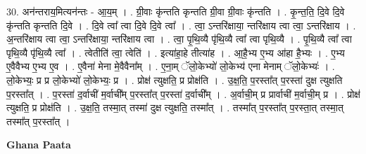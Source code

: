\documentclass[17pt]{extarticle}
\begin{document}
30. अन॑न्तराय॒मित्यन॑न्तः - आ॒य॒म् । . ग्री॒वाः कृ॑न्तति कृन्तति ग्री॒वा ग्री॒वाः कृ॑न्तति । . कृ॒न्त॒ति॒ दि॒वे दि॒वे कृ॑न्तति कृन्तति दि॒वे । . दि॒वे त्वा᳚ त्वा दि॒वे दि॒वे त्वा᳚ । . त्वा॒ ऽन्तरि॑क्षाया॒ न्तरि॑क्षाय त्वा त्वा॒ ऽन्तरि॑क्षाय । . अ॒न्तरि॑क्षाय त्वा त्वा॒ ऽन्तरि॑क्षाया॒ न्तरि॑क्षाय त्वा । . त्वा॒ पृ॒थि॒व्यै पृ॑थि॒व्यै त्वा᳚ त्वा पृथि॒व्यै । . पृ॒थि॒व्यै त्वा᳚ त्वा पृथि॒व्यै पृ॑थि॒व्यै त्वा᳚ । . त्वेतीति॑ त्वा॒ त्वेति॑ । . इत्या॑हा॒हे तीत्या॑ह । . आ॒है॒भ्य ए॒भ्य आ॑हा है॒भ्यः । . ए॒भ्य ए॒वैवैभ्य ए॒भ्य ए॒व । . ए॒वैना॑ मेना मे॒वैवैना᳚म् । . ए॒ना॒म् ॅलो॒केभ्यो॑ लो॒केभ्य॑ एना मेनाम् ॅलो॒केभ्यः॑ । . लो॒केभ्यः॒ प्र प्र लो॒केभ्यो॑ लो॒केभ्यः॒ प्र । . प्रोक्ष॑ त्युक्षति॒ प्र प्रोक्ष॑ति । . उ॒क्ष॒ति॒ प॒रस्ता᳚त् प॒रस्ता॑ दुक्ष त्युक्षति प॒रस्ता᳚त् । . प॒रस्ता॑ द॒र्वाची॑ म॒र्वाची᳚म् प॒रस्ता᳚त् प॒रस्ता॑ द॒र्वाची᳚म् । . अ॒र्वाची॒म् प्र प्रार्वाची॑ म॒र्वाची॒म् प्र । . प्रोक्ष॑ त्युक्षति॒ प्र प्रोक्ष॑ति । . उ॒क्ष॒ति॒ तस्मा॒त् तस्मा॑ दुक्ष त्युक्षति॒ तस्मा᳚त् । . तस्मा᳚त् प॒रस्ता᳚त् प॒रस्ता॒त् तस्मा॒त् तस्मा᳚त् प॒रस्ता᳚त् । \newline

\textbf{Ghana Paata } \newline
\end{document}
